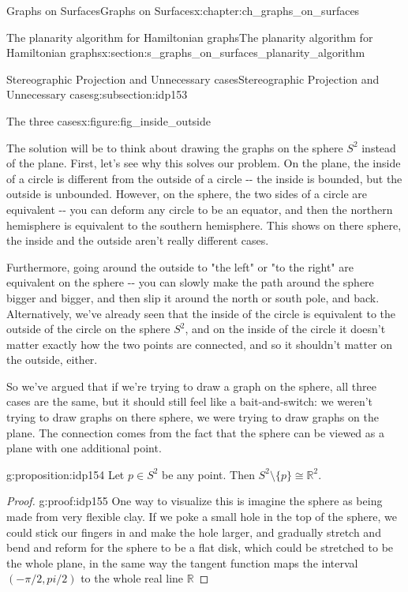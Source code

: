 \documentclass[oneside,10pt,]{book}
\numberwithin{equation}{section}
\newcommand{\reals}{\mathbb{R}}
\begin{document}
\begin{chapterptx}{Graphs on Surfaces}{}{Graphs on Surfaces}{}{}{x:chapter:ch_graphs_on_surfaces}
\begin{sectionptx}{The planarity algorithm for Hamiltonian graphs}{}{The planarity algorithm for Hamiltonian graphs}{}{}{x:section:s_graphs_on_surfaces_planarity_algorithm}
\begin{subsectionptx}{Stereographic Projection and Unnecessary cases}{}{Stereographic Projection and Unnecessary cases}{}{}{g:subsection:idp153}
\begin{figureptx}{The three cases}{x:figure:fig_inside_outside}{}
\begin{image}{0.15}{0.7}{0.15}
{\begin{tikzpicture}[scale=.7]
\end{tikzpicture}
}%
\end{image}%
\tcblower
\end{figureptx}%
The solution will be to think about drawing the graphs on the sphere \(S^2\) instead of the plane.  First, let's see why this solves our problem.  On the plane, the inside of a circle is different from the outside of a circle -{}-{} the inside is bounded, but the outside is unbounded.  However, on the sphere, the two sides of a circle are equivalent -{}-{} you can deform any circle to be an equator, and then the northern hemisphere is equivalent to the southern hemisphere. This shows on there sphere, the inside and the outside aren't really different cases.%
\par
Furthermore, going around the outside to "the left" or "to the right" are equivalent on the sphere -{}-{} you can slowly make the path around the sphere bigger and bigger, and then slip it around the north or south pole, and back.  Alternatively, we've already seen that the inside of the circle is equivalent to the outside of the circle on the sphere \(S^2\), and on the inside of the circle it doesn't matter exactly how the two points are connected, and so it shouldn't matter on the outside, either.%
\par
So we've argued that if we're trying to draw a graph on the sphere, all three cases are the same, but it should still feel like a bait-and-switch: we weren't trying to draw graphs on there sphere, we were trying to draw graphs on the plane.  The connection comes from the fact that the sphere can be viewed as a plane with one additional point.%
\begin{proposition}{}{}{g:proposition:idp154}%
Let \(p\in S^2\) be any point.  Then \(S^2\setminus\{p\}\cong\reals^2\).\end{proposition}
\begin{proof}{}{g:proof:idp155}
One way to visualize this is imagine the sphere as being made from very flexible clay.  If we poke a small hole in the top of the sphere, we could stick our fingers in and make the hole larger, and gradually stretch and bend and reform for the sphere to be a flat disk, which could be stretched to be the whole plane, in the same way the tangent function maps the interval \((-\pi/2, pi/2)\) to the whole real line \(\reals\)%
\par

\end{proof}
\end{subsectionptx}
\end{sectionptx}
\end{chapterptx}
\end{document}
